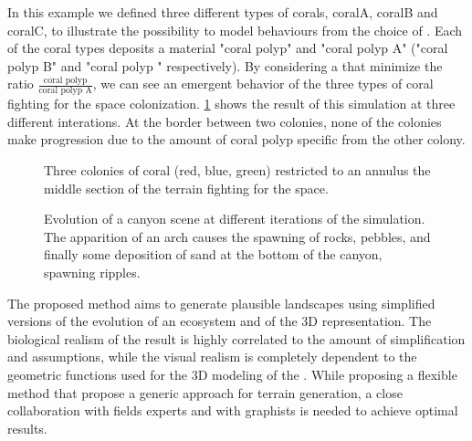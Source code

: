 In this example we defined three different types of corals, coralA, coralB and coralC, to illustrate the possibility to model behaviours from the choice of . Each of the coral types deposits a material "coral polyp" and "coral polyp A" ("coral polyp B" and "coral polyp \curve" respectively). By considering a  that minimize the ratio $\frac{\text{coral polyp}}{\text{coral polyp A}}$, we can see an emergent behavior of the three types of coral fighting for the space colonization.
\cref{fig:env-obj_coral-colonization-scene} shows the result of this simulation at three different interations. At the border between two colonies, none of the colonies make progression due to the amount of coral polyp specific from the other colony.

\begin{figure}
    \caption{Three colonies of coral (red, blue, green) restricted to an annulus the middle section of the terrain fighting for the space.}
    \label{fig:env-obj_coral-colonization-scene}
\end{figure}

\begin{figure}
    \caption{Evolution of a canyon scene at different iterations of the simulation. The apparition of an arch causes the spawning of rocks, pebbles, and finally some deposition of sand at the bottom of the canyon, spawning ripples. }
    \label{fig:env-obj_canyon-scene}
\end{figure}


The proposed method aims to generate plausible landscapes using simplified versions of the evolution of an ecosystem and of the 3D representation. The biological realism of the result is highly correlated to the amount of simplification and assumptions, while the visual realism is completely dependent to the geometric functions used for the 3D modeling of the . While proposing a flexible method that propose a generic approach for terrain generation, a close collaboration with fields experts and with graphists is needed to achieve optimal results.

